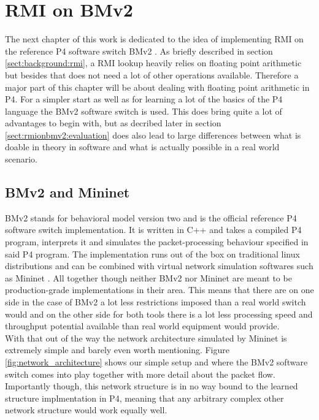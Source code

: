 
\chapter{RMI on BMv2}
\label{ch:rmionbmv2}
The next chapter of this work is dedicated to the idea of implementing RMI on the reference P4 software switch BMv2 \cite{bmv2}. As briefly described in section \ref{sect:background:rmi}, a RMI lookup heavily relies on floating point arithmetic but besides that does not need a lot of other operations available. Therefore a major part of this chapter will be about dealing with floating point arithmetic in P4. For a simpler start as well as for learning a lot of the basics of the P4 language the BMv2 software switch is used. This does bring quite a lot of advantages to begin with, but as decribed later in section \ref{sect:rmionbmv2:evaluation} does also lead to large differences between what is doable in theory in software and what is actually possible in a real world scenario.

\section{BMv2 and Mininet}
BMv2 \cite{bmv2} stands for behavioral model version two and is the official reference P4 software switch implementation. It is written in C++ and takes a compiled P4 program,  interprets it and simulates the packet-processing behaviour specified in said P4 program. The implementation runs out of the box on traditional linux distributions and can be combined with virtual network simulation softwares such as Mininet \cite{mininet}. All together though neither BMv2 nor Mininet are meant to be production-grade implementations in their area. This means that there are on one side in the case of BMv2 a lot less restrictions imposed than a real world switch would and on the other side for both tools there is a lot less processing speed and throughput potential available than real world equipment would provide.\\

With that out of the way the network architecture simulated by Mininet is extremely simple and barely even worth mentioning. Figure \ref{fig:network_architecture} shows our simple setup and where the BMv2 software switch comes into play together with more detail about the packet flow. Importantly though, this network structure is in no way bound to the learned structure implmentation in P4, meaning that any arbitrary complex other network structure would work equally well.

